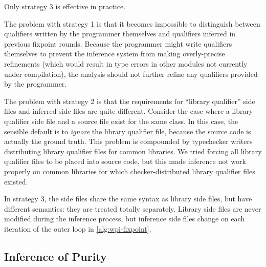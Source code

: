 Only strategy 3 is effective in practice.

The problem with strategy 1 is that it becomes impossible to distinguish
between qualifiers written by the programmer themselves and qualifiers
inferred in previous fixpoint rounds. Because the programmer might write
qualifiers themselves to prevent the inference system from making overly-precise
refinements (which would result in type errors in \eg other modules not currently
under compilation), the analysis should not further refine any qualifiers
provided by the programmer.

The problem with strategy 2 is that
the requirements for ``library qualifier'' side files and inferred side files
are quite different. Consider the case where a library qualifier side file and
a source file exist for the same class. In this case, the sensible default is
to \emph{ignore} the library qualifier file, because the source code is actually
the ground truth. This problem is compounded by typechecker writers distributing
library qualifier files for common libraries. We tried forcing
all library qualifier files to be placed into source code, but this made inference
not work properly on common libraries for which checker-distributed library qualifier files
existed.

In strategy 3, the side files share the same syntax as library side files, but
have different semantics: they are treated totally separately. Library side files
are never modified during the inference process, but inference side files change
on each iteration of the outer loop in \cref{alg:wpi-fixpoint}.

\subsection{Inference of Purity}
\label{sec:purity-inference}


